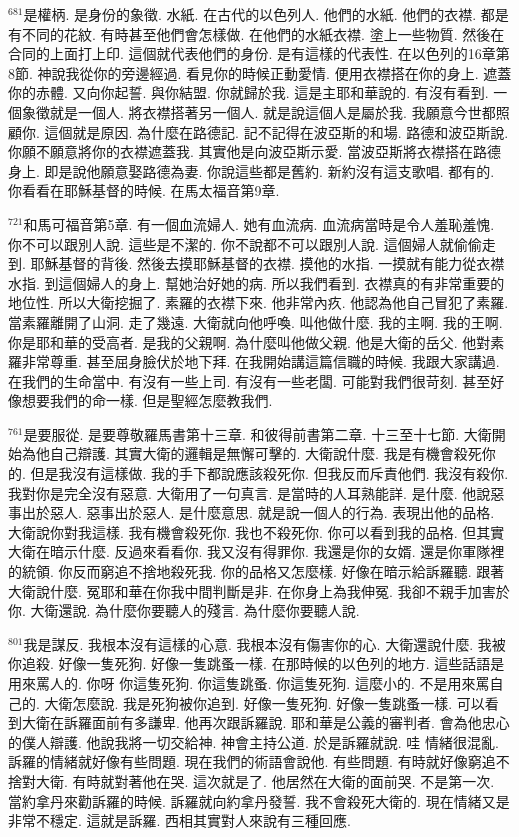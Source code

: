 \documentclass{book}
\begin{document}
$^{681}$是權柄.
是身份的象徵.
水紙.
在古代的以色列人.
他們的水紙.
他們的衣襟.
都是有不同的花紋.
有時甚至他們會怎樣做.
在他們的水紙衣襟.
塗上一些物質.
然後在合同的上面打上印.
這個就代表他們的身份.
是有這樣的代表性.
在以色列的16章第8節.
神說我從你的旁邊經過.
看見你的時候正動愛情.
便用衣襟搭在你的身上.
遮蓋你的赤體.
又向你起誓.
與你結盟.
你就歸於我.
這是主耶和華說的.
有沒有看到.
一個象徵就是一個人.
將衣襟搭著另一個人.
就是說這個人是屬於我.
我願意今世都照顧你.
這個就是原因.
為什麼在路德記.
記不記得在波亞斯的和場.
路德和波亞斯說.
你願不願意將你的衣襟遮蓋我.
其實他是向波亞斯示愛.
當波亞斯將衣襟搭在路德身上.
即是說他願意娶路德為妻.
你說這些都是舊約.
新約沒有這支歌唱.
都有的.
你看看在耶穌基督的時候.
在馬太福音第9章.

$^{721}$和馬可福音第5章.
有一個血流婦人.
她有血流病.
血流病當時是令人羞恥羞愧.
你不可以跟別人說.
這些是不潔的.
你不說都不可以跟別人說.
這個婦人就偷偷走到.
耶穌基督的背後.
然後去摸耶穌基督的衣襟.
摸他的水指.
一摸就有能力從衣襟水指.
到這個婦人的身上.
幫她治好她的病.
所以我們看到.
衣襟真的有非常重要的地位性.
所以大衛挖掘了.
素羅的衣襟下來.
他非常內疚.
他認為他自己冒犯了素羅.
當素羅離開了山洞.
走了幾遠.
大衛就向他呼喚.
叫他做什麼.
我的主啊.
我的王啊.
你是耶和華的受高者.
是我的父親啊.
為什麼叫他做父親.
他是大衛的岳父.
他對素羅非常尊重.
甚至屈身臉伏於地下拜.
在我開始講這篇信職的時候.
我跟大家講過.
在我們的生命當中.
有沒有一些上司.
有沒有一些老闆.
可能對我們很苛刻.
甚至好像想要我們的命一樣.
但是聖經怎麼教我們.

$^{761}$是要服從.
是要尊敬羅馬書第十三章.
和彼得前書第二章.
十三至十七節.
大衛開始為他自己辯護.
其實大衛的邏輯是無懈可擊的.
大衛說什麼.
我是有機會殺死你的.
但是我沒有這樣做.
我的手下都說應該殺死你.
但我反而斥責他們.
我沒有殺你.
我對你是完全沒有惡意.
大衛用了一句真言.
是當時的人耳熟能詳.
是什麼.
他說惡事出於惡人.
惡事出於惡人.
是什麼意思.
就是說一個人的行為.
表現出他的品格.
大衛說你對我這樣.
我有機會殺死你.
我也不殺死你.
你可以看到我的品格.
但其實大衛在暗示什麼.
反過來看看你.
我又沒有得罪你.
我還是你的女婿.
還是你軍隊裡的統領.
你反而窮追不捨地殺死我.
你的品格又怎麼樣.
好像在暗示給訴羅聽.
跟著大衛說什麼.
冤耶和華在你我中間判斷是非.
在你身上為我伸冤.
我卻不親手加害於你.
大衛還說.
為什麼你要聽人的殘言.
為什麼你要聽人說.

$^{801}$我是謀反.
我根本沒有這樣的心意.
我根本沒有傷害你的心.
大衛還說什麼.
我被你追殺.
好像一隻死狗.
好像一隻跳蚤一樣.
在那時候的以色列的地方.
這些話語是用來罵人的.
你呀 你這隻死狗.
你這隻跳蚤.
你這隻死狗.
這麼小的.
不是用來罵自己的.
大衛怎麼說.
我是死狗被你追到.
好像一隻死狗.
好像一隻跳蚤一樣.
可以看到大衛在訴羅面前有多謙卑.
他再次跟訴羅說.
耶和華是公義的審判者.
會為他忠心的僕人辯護.
他說我將一切交給神.
神會主持公道.
於是訴羅就說.
哇 情緒很混亂.
訴羅的情緒就好像有些問題.
現在我們的術語會說他.
有些問題.
有時就好像窮追不捨對大衛.
有時就對著他在哭.
這次就是了.
他居然在大衛的面前哭.
不是第一次.
當約拿丹來勸訴羅的時候.
訴羅就向約拿丹發誓.
我不會殺死大衛的.
現在情緒又是非常不穩定.
這就是訴羅.
西相其實對人來說有三種回應.
\end{document}
